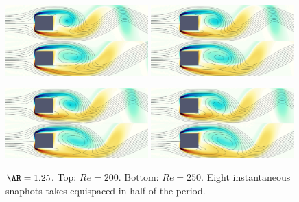\begin{figure}
  \includegraphics[width=0.49\textwidth]{./fig/AR1p25/snap/snap.0030.png}
  \includegraphics[width=0.49\textwidth]{./fig/AR1p25/snap/snap.0035.png}
  \includegraphics[width=0.49\textwidth]{./fig/AR1p25/snap/snap.0040.png}
  \includegraphics[width=0.49\textwidth]{./fig/AR1p25/snap/snap.0045.png}  
  \caption{$\AR=1.25$. Top: $Re=200$. Bottom: $Re=250$. Eight instantaneous snaphots takes equispaced in half of the period.}
\end{figure}      

